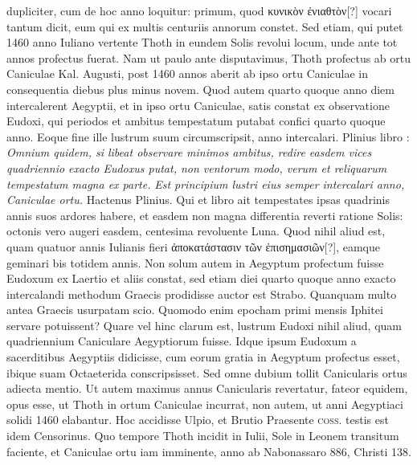 dupliciter, cum de hoc anno loquitur: primum, quod \textgreek{κυνικὸν
ἐνιαθτὸν}[?] vocari tantum dicit, eum qui ex multis centuriis annorum
constet.
Sed etiam, qui putet 1460 anno Iuliano vertente Thoth in
eundem Solis revolui locum, unde ante tot annos profectus fuerat.
Nam ut paulo ante disputavimus, Thoth profectus ab ortu Caniculae
Kal. Augusti, post 1460 annos aberit ab ipso ortu Caniculae in consequentia
diebus plus minus novem.
Quod autem quarto quoque
anno diem intercalerent Aegyptii, et in ipso ortu Caniculae, satis
constat ex observatione Eudoxi, qui periodos et ambitus tempestatum
putabat confici quarto quoque anno.
Eoque fine ille lustrum
suum circumscripsit, anno intercalari.
Plinius libro : \textit{Omnium
quidem, si libeat observare minimos ambitus, redire easdem vices quadriennio
exacto Eudoxus putat, non ventorum modo, verum et reliquarum
tempestatum magna ex parte.}
\textit{Est principium lustri eius semper intercalari
anno, Caniculae ortu.}
Hactenus Plinius.
Qui et libro  ait tempestates
ipsas quadrinis annis suos ardores habere, et easdem non magna
differentia reverti ratione Solis: octonis vero augeri easdem, centesima
revoluente Luna.
Quod nihil aliud est, quam quatuor annis Iulianis
fieri \textgreek{ἀποκατάστασιν τῶν ἐπισημασιῶν}[?], eamque geminari bis totidem
annis.
%
Non solum autem in Aegyptum profectum fuisse Eudoxum
ex Laertio et aliis constat, sed etiam diei quarto quoque anno
exacto intercalandi methodum Graecis prodidisse auctor est Strabo.
Quanquam multo antea Graecis usurpatam scio.
Quomodo enim
epocham primi mensis Iphitei servare potuissent?
Quare vel hinc
clarum est, lustrum Eudoxi nihil aliud, quam quadriennium Caniculare
Aegyptiorum fuisse.
Idque ipsum Eudoxum a sacerditibus
Aegyptiis didicisse, cum eorum gratia in Aegyptum profectus esset,
ibique suam Octaeterida conscripsisset.
Sed omne dubium tollit Canicularis
ortus adiecta mentio.
Ut autem maximus annus Canicularis
revertatur, fateor equidem, opus esse, ut Thoth in ortum Caniculae
incurrat, non autem, ut anni Aegyptiaci solidi 1460 elabantur.
Hoc accidisse Ulpio, et Brutio Praesente \textsc{coss}.
 testis est idem Censorinus.
Quo tempore Thoth incidit in  Iulii, Sole in Leonem transitum
faciente, et Caniculae ortu iam imminente, anno ab %
 Nabonassaro
886, Christi 138.

